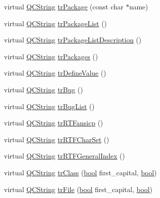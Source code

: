 \begin{DoxyCompactItemize}
\item 
virtual \hyperlink{class_q_c_string}{Q\+C\+String} \hyperlink{class_translator_hungarian_ae1ae8f3c99147763e70c1c050f8af2be}{tr\+Package} (const char $\ast$name)
\item 
virtual \hyperlink{class_q_c_string}{Q\+C\+String} \hyperlink{class_translator_hungarian_a3bc593b7e7939e7707bd9d992e2199c6}{tr\+Package\+List} ()
\item 
virtual \hyperlink{class_q_c_string}{Q\+C\+String} \hyperlink{class_translator_hungarian_a7758cc8c0fbd6e509b2d1a1084477cc1}{tr\+Package\+List\+Description} ()
\item 
virtual \hyperlink{class_q_c_string}{Q\+C\+String} \hyperlink{class_translator_hungarian_a8374b940a1e9ebd61d7a9f3cbe0637f2}{tr\+Packages} ()
\item 
virtual \hyperlink{class_q_c_string}{Q\+C\+String} \hyperlink{class_translator_hungarian_a33706fd1bba9650d760a1a9bba4ce964}{tr\+Define\+Value} ()
\item 
virtual \hyperlink{class_q_c_string}{Q\+C\+String} \hyperlink{class_translator_hungarian_a9b8f93611a494a7c149033197a47d558}{tr\+Bug} ()
\item 
virtual \hyperlink{class_q_c_string}{Q\+C\+String} \hyperlink{class_translator_hungarian_ab68b764947211238dcabe72467feec23}{tr\+Bug\+List} ()
\item 
virtual \hyperlink{class_q_c_string}{Q\+C\+String} \hyperlink{class_translator_hungarian_aa3e8143837bae2721e36eff9ac36d120}{tr\+R\+T\+Fansicp} ()
\item 
virtual \hyperlink{class_q_c_string}{Q\+C\+String} \hyperlink{class_translator_hungarian_a014b331cc67eeb168b98f0bc6270fdff}{tr\+R\+T\+F\+Char\+Set} ()
\item 
virtual \hyperlink{class_q_c_string}{Q\+C\+String} \hyperlink{class_translator_hungarian_a3077462c7ac66e2196d5ccb6a935da87}{tr\+R\+T\+F\+General\+Index} ()
\item 
virtual \hyperlink{class_q_c_string}{Q\+C\+String} \hyperlink{class_translator_hungarian_a307945db84f986c0c91baf438313dfc4}{tr\+Class} (\hyperlink{qglobal_8h_a1062901a7428fdd9c7f180f5e01ea056}{bool} first\+\_\+capital, \hyperlink{qglobal_8h_a1062901a7428fdd9c7f180f5e01ea056}{bool})
\item 
virtual \hyperlink{class_q_c_string}{Q\+C\+String} \hyperlink{class_translator_hungarian_a16f2d0fc3aa2ac9e51a6204a65270743}{tr\+File} (\hyperlink{qglobal_8h_a1062901a7428fdd9c7f180f5e01ea056}{bool} first\+\_\+capital, \hyperlink{qglobal_8h_a1062901a7428fdd9c7f180f5e01ea056}{bool})

\end{DoxyCompactItemize}
